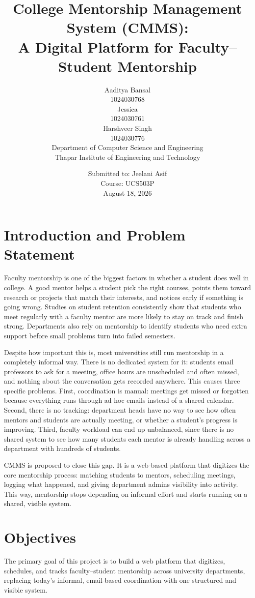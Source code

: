 \documentclass[11pt]{article}
\title{\Large\textbf{College Mentorship Management System (CMMS):}\\[0.2em]
\Large\textbf{A Digital Platform for Faculty--Student Mentorship}}
\author{
  \relax Aaditya Bansal \\ \small 1024030768 \\[0.3em]
  \relax Jessica \\ \small 1024030761 \\[0.3em]
  \relax Harshveer Singh \\ \small 1024030776 \\[0.3em]
  \small Department of Computer Science and Engineering \\
  \small Thapar Institute of Engineering and Technology
}
\date{Submitted to: Jeelani Asif \\ Course: UCS503P \\ August 18, 2026}
\begin{document}
\maketitle
\thispagestyle{empty}
\vspace{0.5em}

\section{Introduction and Problem Statement}
Faculty mentorship is one of the biggest factors in whether a student does well in college. A good mentor helps a student pick the right courses, points them toward research or projects that match their interests, and notices early if something is going wrong. Studies on student retention consistently show that students who meet regularly with a faculty mentor are more likely to stay on track and finish strong. Departments also rely on mentorship to identify students who need extra support before small problems turn into failed semesters.

Despite how important this is, most universities still run mentorship in a completely informal way. There is no dedicated system for it: students email professors to ask for a meeting, office hours are unscheduled and often missed, and nothing about the conversation gets recorded anywhere. This causes three specific problems. First, coordination is manual: meetings get missed or forgotten because everything runs through ad hoc emails instead of a shared calendar. Second, there is no tracking: department heads have no way to see how often mentors and students are actually meeting, or whether a student's progress is improving. Third, faculty workload can end up unbalanced, since there is no shared system to see how many students each mentor is already handling across a department with hundreds of students.

CMMS is proposed to close this gap. It is a web-based platform that digitizes the core mentorship process: matching students to mentors, scheduling meetings, logging what happened, and giving department admins visibility into activity. This way, mentorship stops depending on informal effort and starts running on a shared, visible system.

\section{Objectives}
The primary goal of this project is to build a web platform that digitizes, schedules, and tracks faculty--student mentorship across university departments, replacing today's informal, email-based coordination with one structured and visible system.
\end{document}
